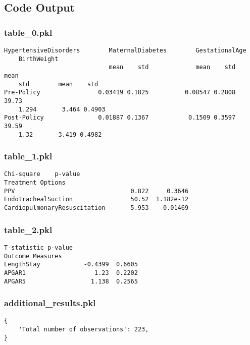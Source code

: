 \documentclass[11pt]{article}
\begin{document}
\subsection{Code Output}

\subsubsection*{table\_0.pkl}

\begin{Verbatim}[tabsize=4]
            HypertensiveDisorders        MaternalDiabetes        GestationalAge
	BirthWeight
                             mean    std             mean    std           mean
	std        mean    std
Pre-Policy                0.03419 0.1825          0.08547 0.2808          39.73
	1.294       3.464 0.4903
Post-Policy               0.01887 0.1367           0.1509 0.3597          39.59
	1.32       3.419 0.4982
\end{Verbatim}

\subsubsection*{table\_1.pkl}

\begin{Verbatim}[tabsize=4]
                              Chi-square    p-value
Treatment Options
PPV                                0.822     0.3646
EndotrachealSuction                50.52  1.182e-12
CardiopulmonaryResuscitation       5.953    0.01469
\end{Verbatim}

\subsubsection*{table\_2.pkl}

\begin{Verbatim}[tabsize=4]
                  T-statistic p-value
Outcome Measures
LengthStay            -0.4399  0.6605
APGAR1                   1.23  0.2202
APGAR5                  1.138  0.2565
\end{Verbatim}

\subsubsection*{additional\_results.pkl}

\begin{Verbatim}[tabsize=4]
{
    'Total number of observations': 223,
}
\end{Verbatim}
\end{document}
